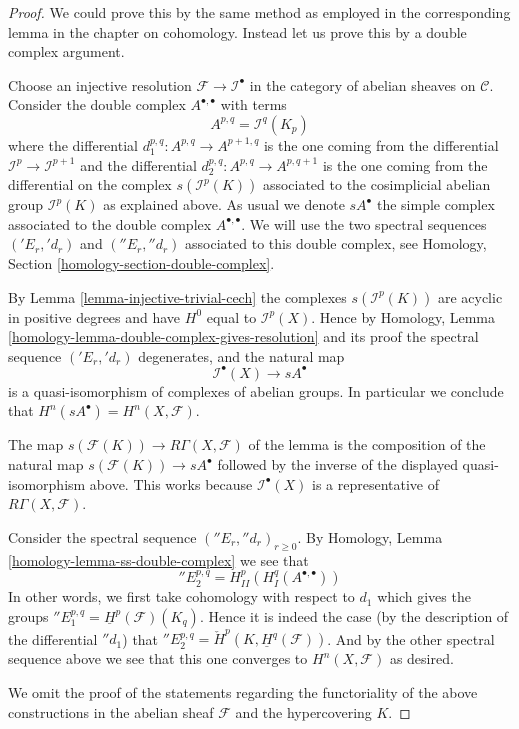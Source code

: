 \begin{proof}
We could prove this by the same method as employed in the corresponding
lemma in the chapter on cohomology. Instead let us prove this by a
double complex argument.

\medskip\noindent
Choose an injective resolution $\mathcal{F} \to \mathcal{I}^\bullet$
in the category of abelian sheaves on $\mathcal{C}$. Consider the
double complex $A^{\bullet, \bullet}$ with terms
$$
A^{p, q} = \mathcal{I}^q(K_p)
$$
where the differential $d_1^{p, q} : A^{p, q} \to A^{p + 1, q}$
is the one coming from the differential $\mathcal{I}^p \to \mathcal{I}^{p + 1}$
and the differential $d_2^{p, q} : A^{p, q} \to A^{p, q + 1}$ is the
one coming from the differential on the complex
$s(\mathcal{I}^p(K))$ associated to the cosimplicial abelian group
$\mathcal{I}^p(K)$ as explained above.
As usual we denote $sA^\bullet$ the simple complex associated to
the double complex $A^{\bullet, \bullet}$.
We will use the two spectral
sequences $({}'E_r, {}'d_r)$ and $({}''E_r, {}''d_r)$
associated to this double complex, see
Homology, Section \ref{homology-section-double-complex}.

\medskip\noindent
By Lemma \ref{lemma-injective-trivial-cech}
the complexes $s(\mathcal{I}^p(K))$ are acyclic in
positive degrees and have $H^0$ equal to $\mathcal{I}^p(X)$.
Hence by
Homology, Lemma \ref{homology-lemma-double-complex-gives-resolution}
and its proof the spectral sequence $({}'E_r, {}'d_r)$ degenerates,
and the natural map
$$
\mathcal{I}^\bullet(X) \longrightarrow sA^\bullet
$$
is a quasi-isomorphism of complexes of abelian groups. In particular
we conclude that $H^n(sA^\bullet) = H^n(X, \mathcal{F})$.

\medskip\noindent
The map $s(\mathcal{F}(K)) \longrightarrow R\Gamma(X, \mathcal{F})$ of
the lemma is the composition of the natural map
$s(\mathcal{F}(K)) \to sA^\bullet$ followed by the inverse
of the displayed quasi-isomorphism above. This works because
$\mathcal{I}^\bullet(X)$ is a representative of $R\Gamma(X, \mathcal{F})$.

\medskip\noindent
Consider the spectral sequence $({}''E_r, {}''d_r)_{r \geq 0}$. By
Homology, Lemma \ref{homology-lemma-ss-double-complex}
we see that
$$
{}''E_2^{p, q} = H^p_{II}(H^q_I(A^{\bullet, \bullet}))
$$
In other words, we first take cohomology with respect to
$d_1$ which gives the groups
${}''E_1^{p, q} = \underline{H}^p(\mathcal{F})(K_q)$.
Hence it is indeed the case (by the description of the differential
${}''d_1$) that
${}''E_2^{p, q} = \check{H}^p(K, \underline{H}^q(\mathcal{F}))$.
And by the other spectral sequence above we see that this one
converges to $H^n(X, \mathcal{F})$ as desired.

\medskip\noindent
We omit the proof of the statements regarding the functoriality of
the above constructions in the abelian sheaf $\mathcal{F}$ and the
hypercovering $K$.
\end{proof}









